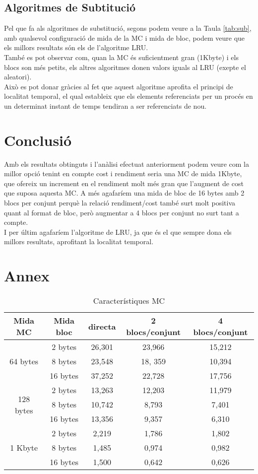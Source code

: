 \documentclass{article}
\begin{document}
\subsection{Algoritmes de Subtitució}
Pel que fa als algoritmes de substitució, segons podem veure a la Taula \ref{tab:sub}, amb qualsevol
 configuració de mida de la MC i mida de bloc, podem veure que els millors resultats són els de l'algoritme LRU.\\
També es pot observar com, quan la MC és suficientment gran (1Kbyte) i els blocs son més petits, els altres 
algoritmes donen valors iguals al LRU (exepte el aleatori).\\
 Això es pot donar gràcies al fet que aquest algoritme aprofita el principi de localitat temporal, el qual estableix 
que els elements referenciats per un procés en un determinat instant de temps tendiran a ser referenciats de nou.\\
\section{Conclusió}
Amb els resultats obtinguts i l'anàlisi efectuat anteriorment podem veure com la millor opció tenint en compte cost
 i rendiment seria una MC de mida 1Kbyte, que ofereix un increment en el rendiment molt més gran que l'augment
 de cost que suposa aquesta MC. A més agafaríem una mida de bloc de 16 bytes amb 2 blocs per conjunt perquè
 la relació rendiment/cost també surt molt positiva quant al format de bloc, però augmentar a 4 blocs per conjunt 
no surt tant a compte.\\
I per últim agafaríem l'algoritme de LRU, ja que és el que sempre dona els millors resultats, aprofitant la localitat temporal.
\newpage
\section{Annex}
\begin{table}[!h]
\centering
\begin{tabular}{ |c|c|c|c|c| }
\hline
Mida MC& Mida bloc& directa& 2 blocs/conjunt& 4 blocs/conjunt \\
\hline
\multirow{3}{4em}{64 bytes} & 2 bytes & 26,301 & 23,966 & 15,212 \\
& 8 bytes & 23,548 & 18, 359 & 10,394 \\
& 16 bytes & 37,252 & 22,728 & 17,756 \\
\hline
\multirow{3}{4em}{128 bytes} & 2 bytes & 13,263 & 12,203 & 11,979 \\
& 8 bytes & 10,742 & 8,793 & 7,401 \\
& 16 bytes & 13,356 & 9,357 & 6,310 \\
\hline
\multirow{3}{4em}{1 Kbyte} & 2 bytes & 2,219 & 1,786 & 1,802 \\
& 8 bytes & 1,485 & 0,974 & 0,982 \\
& 16 bytes & 1,500 & 0,642 & 0,626 \\
\hline
\end{tabular}
\caption{Característiques MC}
\label{tab:mc}
\end{table}
\end{document}
